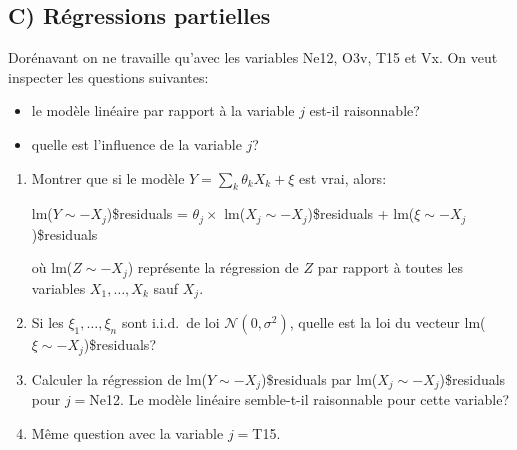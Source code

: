 \documentclass[a4paper,11pt,fleqn]{article}
\newcommand{\1}{\ensuremath{\mathbbm{1}}}
\begin{document}
\subsection*{C) R\'egressions partielles}
Dor\'enavant on ne travaille qu'avec les variables Ne12, O3v, T15 et Vx. On veut inspecter les questions suivantes:
\begin{itemize}
\item le mod\`ele lin\'eaire par rapport \`a la variable $j$ est-il raisonnable?
\item quelle est l'influence de la variable $j$?
\end{itemize}
\begin{enumerate}
\item Montrer que si le mod\`ele $Y=\sum_{k}\theta_{k}X_{k}+\xi$ est vrai, alors:

lm($Y\sim -X_{j}$)\$residuals = $\theta_{j}\times$ lm($X_{j} \sim -X_{j}$)\$residuals + lm($\xi \sim -X_{j}$)\$residuals

o\`u lm($Z\sim -X_{j}$) repr\'esente la r\'egression de $Z$ par rapport \`a toutes les variables $X_{1},\ldots,X_{k}$ sauf $X_{j}$.
\item Si les $\xi_{1},\ldots,\xi_{n}$ sont i.i.d.\ de loi $\mathcal{N}(0,\sigma^2)$,
quelle est la loi du vecteur lm($\xi \sim -X_{j}$)\$residuals?
\item Calculer la r\'egression de lm($Y\sim -X_{j}$)\$residuals par lm($X_{j} \sim -X_{j}$)\$residuals pour $j=$Ne12. Le mod\`ele lin\'eaire semble-t-il raisonnable pour cette variable?
\item M\^eme question avec la variable $j=$T15.
 \end{enumerate}
\end{document}

